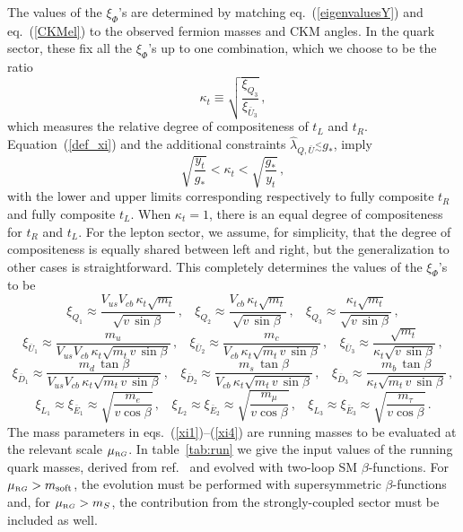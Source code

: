 \documentclass[a4paper,12pt]{article}
\newcommand{\lsim}{\stackrel{<}{_\sim}}
\newcommand{\beq}{\begin{equation}}
\newcommand{\eeq}{\end{equation}}
\def\eq#1{eq.~(\ref{#1})}
\def\eq#1{eq.~(\ref{#1})}
\def\mS{m_S}
\def\msoft{m_{\rm soft}}
\def\hlambda{\hat\lambda}
\def\muRG{\mu_{\scriptscriptstyle{\textrm RG}}}
\begin{document}
The values of the $\xi_\Phi$'s are determined by matching \eq{eigenvaluesY} and \eq{CKMel}
 to the observed fermion masses and  CKM angles. In the quark sector, these  fix all the $\xi_\Phi$'s up to one combination, which we choose to be the
ratio 
\beq
\kappa_t \equiv \sqrt{\frac{\xi_{Q_3}}{\xi_{{\bar U}_3}}} \, ,
\eeq
which measures the relative degree of compositeness of $t_L$ and  $t_R$.  Equation~(\ref{def_xi}) and the additional constraints 
$\hlambda_{Q,{\bar U}}\lsim g_*$, imply
\beq
\sqrt{\frac{y_t}{g_*}} < \kappa_t < \sqrt{\frac{g_*}{y_t}}\, , 
\eeq
with the lower and upper limits corresponding respectively to fully composite $t_R$ and fully composite $t_L$. 
When $\kappa_t =1$, there is an equal degree of compositeness for $t_R$ and $t_L$.
For the lepton sector, we assume, for simplicity, that the degree of compositeness is equally shared between left and right, but the generalization to other cases is straightforward. This completely determines the values of the $\xi_\Phi$'s to be
\beq
\xi_{Q_1}\approx \frac{V_{us} V_{cb} \, \kappa_t\sqrt{m_t}}{\sqrt{v\, \sin \beta}} \,,~~~~
\xi_{Q_2}\approx \frac{V_{cb} \, \kappa_t\sqrt{m_t}}{\sqrt{v\, \sin \beta}} \,,~~~~
\xi_{Q_3}\approx \frac{ \kappa_t\sqrt{m_t}}{\sqrt{v\, \sin \beta}} \, ,
\label{xi1}
\eeq
\beq
\xi_{\bar U_1}\approx \frac{m_u}{V_{us} V_{cb} \, \kappa_t  \sqrt{m_t \, v\, \sin\beta}} \,,~~~~
\xi_{\bar U_2}\approx \frac{m_c}{V_{cb} \, \kappa_t \sqrt{m_t \, v\, \sin\beta}} \,,~~~~
\xi_{\bar U_3}\approx \frac{\sqrt{m_t}}{\kappa_t \sqrt{v\, \sin\beta}} \, ,
\label{xi2}
\eeq
\beq
\xi_{\bar D_1}\approx \frac{m_d\, \tan\beta}{V_{us} V_{cb} \, \kappa_t \sqrt{m_t \, v\, \sin\beta}}  \,,~~~~
\xi_{\bar D_2}\approx \frac{m_s\, \tan\beta}{V_{cb} \, \kappa_t \sqrt{m_t \, v\, \sin\beta}}  \,,~~~~
\xi_{\bar D_3}\approx \frac{m_b\, \tan\beta}{ \kappa_t \sqrt{m_t \, v\, \sin\beta}}  \, ,
\label{xi3}
\eeq
\beq
\xi_{L_1}\approx \xi_{\bar E_1} \approx \sqrt{\frac{m_e}{v \cos\beta}} \,,~~~~
\xi_{L_2}\approx \xi_{\bar E_2} \approx \sqrt{\frac{m_\mu}{v \cos\beta}} \,,~~~~
\xi_{L_3}\approx \xi_{\bar E_3} \approx \sqrt{\frac{m_\tau}{v \cos\beta}} \, .
\label{xi4}
\eeq
The mass parameters in eqs.~(\ref{xi1})--(\ref{xi4}) are running masses to be evaluated at the relevant scale $\muRG$. In table~\ref{tab:run} we give the input values of the running quark masses, derived from ref.~\cite{Huang:2020hdv} and evolved with two-loop SM $\beta$-functions. For $\muRG >\msoft$, the evolution must be performed with supersymmetric $\beta$-functions and, for $\muRG > \mS$, the contribution from the strongly-coupled sector must be included as well.
\end{document}
